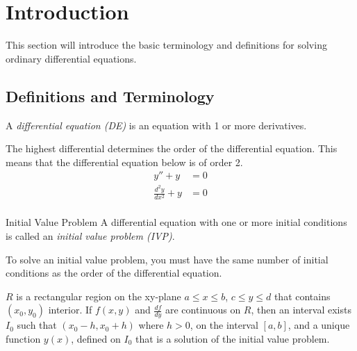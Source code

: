 \section{Introduction} \label{sec:Introduction}
This section will introduce the basic terminology and definitions for solving ordinary differential equations.
	\subsection{Definitions and Terminology} \label{subsec:Definitions and Terminology}
		\begin{definition} \label{def:Differential Equation}
			A \emph{differential equation (DE)} is an equation with 1 or more derivatives.
			\begin{remark}
				The highest differential determines the order of the differential equation.
				This means that the differential equation below is of order 2.
				\begin{align*} 
					y'' + y &= 0 \\
					\frac{d^{2}y}{dx^{2}} + y &= 0 \\
				\end{align*} 
			\end{remark}
		\end{definition}
		\begin{definition}{Initial Value Problem} \label{def:Initial Value Problem}
			A differential equation with one or more initial conditions is called an \emph{initial value problem (IVP)}.
			\begin{remark}
				To solve an initial value problem, you must have the same number of initial conditions as the order of the differential equation.
			\end{remark}
			\begin{remark}
				$R$ is a rectangular region on the xy-plane $a \leq x \leq b$, $c \leq y \leq d$ that contains $\left( x_{0}, y_{0} \right)$ interior.
				If $f \left( x,y \right)$ and $\frac{df}{dy}$ are continuous on $R$, then an interval exists $I_{0}$ such that $\left( x_{0}-h, x_{0}+h \right)$ where $h>0$, on the interval $\left[ a,b \right]$, and a unique function $y \left( x \right)$, defined on $I_{0}$ that is a solution of the initial value problem.
			\end{remark}
		\end{definition}
	
